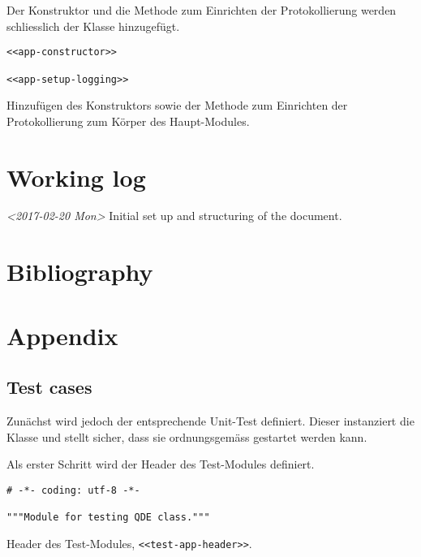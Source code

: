\documentclass[10pt, openright, notitlepage]{scrreprt}
\begin{document}
Der Konstruktor und die Methode zum Einrichten der Protokollierung werden
schliesslich der Klasse hinzugefügt.

\begin{listing}[H]
\begin{verbatim}
<<app-constructor>>

<<app-setup-logging>>
\end{verbatim}
\caption{\label{org1244001}
Hinzufügen des Konstruktors sowie der Methode zum Einrichten der Protokollierung zum Körper des Haupt-Modules.}
\end{listing}

\chapter{Working log}
\label{sec:orgdf17598}

\textit{<2017-02-20 Mon> } Initial set up and structuring of the document.

\chapter{Bibliography}
\label{sec:org87248af}

\printbibliography{}

\chapter{Appendix}
\label{sec:org1f6994c}

\section{Test cases}
\label{sec:org4cc26c0}

Zunächst wird jedoch der entsprechende Unit-Test definiert. Dieser instanziert
die Klasse und stellt sicher, dass sie ordnungsgemäss gestartet werden kann.

Als erster Schritt wird der Header des Test-Modules definiert.

\begin{listing}[H]
\begin{verbatim}
# -*- coding: utf-8 -*-

"""Module for testing QDE class."""
\end{verbatim}
\caption{\label{org5bba854}
Header des Test-Modules, \texttt{<<test-app-header>>}.}
\end{listing}
\end{document}
